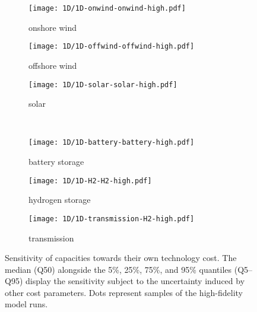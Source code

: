 \begin{figure}
    \begin{subfigure}[t]{0.32\textwidth}
        \caption{onshore wind}
        \texttt{[image: 1D/1D-onwind-onwind-high.pdf]}
    \end{subfigure}
    \begin{subfigure}[t]{0.32\textwidth}
        \caption{offshore wind}
        \texttt{[image: 1D/1D-offwind-offwind-high.pdf]}
    \end{subfigure}
    \begin{subfigure}[t]{0.32\textwidth}
        \caption{solar}
        \texttt{[image: 1D/1D-solar-solar-high.pdf]}
    \end{subfigure} \\
    \begin{subfigure}[t]{0.32\textwidth}
        \caption{battery storage}
        \texttt{[image: 1D/1D-battery-battery-high.pdf]}
    \end{subfigure}
    \begin{subfigure}[t]{0.32\textwidth}
        \caption{hydrogen storage}
        \texttt{[image: 1D/1D-H2-H2-high.pdf]}
    \end{subfigure}
    \begin{subfigure}[t]{0.32\textwidth}
        \caption{transmission}
        \texttt{[image: 1D/1D-transmission-H2-high.pdf]}
    \end{subfigure}
    \vspace{-0.3cm}
    \caption{
      Sensitivity of capacities towards their own technology cost.
      The median (Q50) alongside the 5\%, 25\%, 75\%, and 95\% quantiles (Q5--Q95) display
      the sensitivity subject to the uncertainty induced by other cost parameters.
      Dots represent samples of the high-fidelity model runs.
    }
    \label{fig:sensitivity}
\end{figure}

